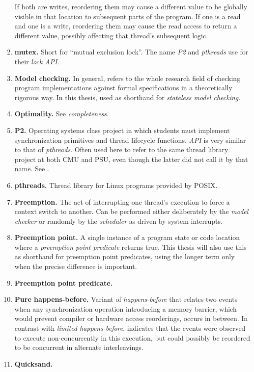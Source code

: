 \begin{enumerate}
		If both are writes, reordering them may cause a different value to be globally visible in that location
		to subsequent parts of the program.
		If one is a read and one is a write, reordering them may cause the read access to return a different value,
		possibly affecting that thread's subsequent logic.
	\item {\bf mutex.}
		Short for ``mutual exclusion lock''. The name {\em P2} and {\em pthreads} use for their {\em lock API}.
	\item {\bf Model checking.}
		In general, refers to the whole research field of checking program implementations against
		formal specifications in a theoretically rigorous way.
		In this thesis, used as shorthand for {\em stateless model checking}.
	\item {\bf Optimality.} See {\em completeness}.
	\item {\bf P2.}
		Operating systems class project in which students must implement synchronization primitives
		and thread lifecycle functions.
		{\em API} is very similar to that of {\em pthreads}.
		Often used here to refer to the same thread library project at both CMU and PSU,
		even though the latter did not call it by that name.
		See \sect{\ref{sec:pebbles}}.
	\item {\bf pthreads.}
		Thread library for Linux programs provided by POSIX.
	\item {\bf Preemption.}
		The act of interrupting one thread's execution to force a context switch to another.
		Can be performed either deliberately by the {\em model checker}
		or randomly by the {\em scheduler} as driven by system interrupts.
	\item {\bf Preemption point.}
		A single instance of a program state or code location where a {\em preemption point predicate} returns true.
		This thesis will also use this as shorthand for preemption point predicates,
		using the longer term only when the precise difference is important.
	\item {\bf Preemption point predicate.}
	\item {\bf Pure happens-before.}
		Variant of {\em happens-before} that relates two events when any synchronization operation introducing a memory
		barrier, which would prevent compiler or hardware access reorderings, occurs in between.
		In contrast with {\em limited happens-before},
		indicates that the events were observed to execute non-concurrently in this execution,
		but could possibly be reordered to be concurrent in alternate interleavings.
	\item {\bf Quicksand.}

\end{enumerate}
